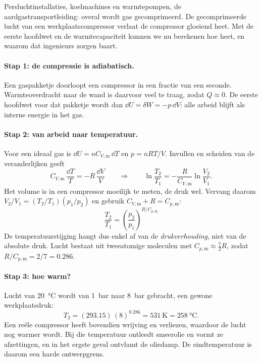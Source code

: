 Persluchtinstallaties, koelmachines en warmtepompen, de aardgastransportleiding: overal wordt gas gecomprimeerd. De gecomprimeerde lucht van een werkplaatscompressor verlaat de compressor gloeiend heet. Met de eerste hoofdwet en de warmtecapaciteit kunnen we nu berekenen hoe heet, en waarom dat ingenieurs zorgen baart.

\paragraph{Stap 1: de compressie is adiabatisch.}
Een gaspakketje doorloopt een compressor in een fractie van een seconde. Warmteoverdracht naar de wand is daarvoor veel te traag, zodat $Q \approx 0$. De eerste hoofdwet voor dat pakketje wordt dan $\dd U = \delta W = -p\,\dd V$: alle arbeid blijft als interne energie in het gas.

\paragraph{Stap 2: van arbeid naar temperatuur.}
Voor een ideaal gas is $\dd U = nC_{V,\mathrm{m}}\,\dd T$ en $p = nRT/V$. Invullen en scheiden van de veranderlijken geeft
\[
C_{V,\mathrm{m}}\,\frac{\dd T}{T} = -R\,\frac{\dd V}{V}
\qquad\Longrightarrow\qquad
\ln\frac{T_2}{T_1} = -\frac{R}{C_{V,\mathrm{m}}}\ln\frac{V_2}{V_1}.
\]
Het volume is in een compressor moeilijk te meten, de druk wel. Vervang daarom $V_2/V_1 = (T_2/T_1)(p_1/p_2)$ en gebruik $C_{V,\mathrm{m}} + R = C_{p,\mathrm{m}}$:
\begin{equation}
\boxed{\;\frac{T_2}{T_1} = \left(\frac{p_2}{p_1}\right)^{R/C_{p,\mathrm{m}}}\;}
\label{eq:adiabatische-compressie}
\end{equation}
De temperatuurstijging hangt dus enkel af van de \emph{drukverhouding}, niet van de absolute druk. Lucht bestaat uit tweeatomige moleculen met $C_{p,\mathrm{m}} \approx \tfrac{7}{2}R$, zodat $R/C_{p,\mathrm{m}} = 2/7 = 0.286$.

\paragraph{Stap 3: hoe warm?}
Lucht van \SI{20}{\celsius} wordt van \SI{1}{\bar} naar \SI{8}{\bar} gebracht, een gewone werkplaatsdruk:
\[
T_2 = (293.15)\,(8)^{0.286} = \SI{531}{\kelvin} = \SI{258}{\celsius}.
\]
Een re\"ele compressor heeft bovendien wrijving en verliezen, waardoor de lucht nog warmer wordt. Bij die temperatuur ontleedt smeerolie en vormt ze afzettingen, en in het ergste geval ontvlamt de oliedamp. De eindtemperatuur is daarom een harde ontwerpgrens.


